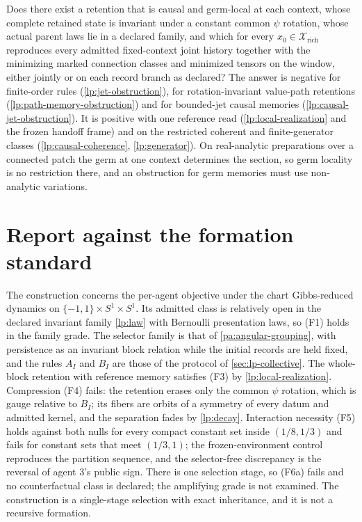Does there exist a retention that is causal and germ-local at each context, whose complete retained state is invariant under a constant common $\psi$ rotation, whose actual parent laws lie in a declared family, and which for every $x_0\in\mathcal X_{\mathrm{rich}}$ reproduces every admitted fixed-context joint history together with the minimizing marked connection classes and minimized tensors on the window, either jointly or on each record branch as declared? The answer is negative for finite-order rules (\cref{lp:jet-obstruction}), for rotation-invariant value-path retentions (\cref{lp:path-memory-obstruction}) and for bounded-jet causal memories (\cref{lp:causal-jet-obstruction}). It is positive with one reference read (\cref{lp:local-realization} and the frozen handoff frame) and on the restricted coherent and finite-generator classes (\cref{lp:causal-coherence}, \cref{lp:generator}). On real-analytic preparations over a connected patch the germ at one context determines the section, so germ locality is no restriction there, and an obstruction for germ memories must use non-analytic variations.

\section{Report against the formation standard}

The construction concerns the per-agent objective under the chart Gibbs-reduced dynamics on $\{-1,1\}\times S^1\times S^1$. Its admitted class is relatively open in the declared invariant family \cref{lp:law} with Bernoulli presentation laws, so (F1) holds in the family grade. The selector family is that of \cref{pa:angular-grouping}, with persistence as an invariant block relation while the initial records are held fixed, and the rules $A_I$ and $B_I$ are those of the protocol of \cref{sec:lp-collective}. The whole-block retention with reference memory satisfies (F3) by \cref{lp:local-realization}. Compression (F4) fails: the retention erases only the common $\psi$ rotation, which is gauge relative to $B_I$; its fibers are orbits of a symmetry of every datum and admitted kernel, and the separation fades by \cref{lp:decay}. Interaction necessity (F5) holds against both nulls for every compact constant set inside $(1/8,1/3)$ and fails for constant sets that meet $(1/3,1)$; the frozen-environment control reproduces the partition sequence, and the selector-free discrepancy is the reversal of agent $3$'s public sign. There is one selection stage, so (F6a) fails and no counterfactual class is declared; the amplifying grade is not examined. The construction is a single-stage selection with exact inheritance, and it is not a recursive formation.
